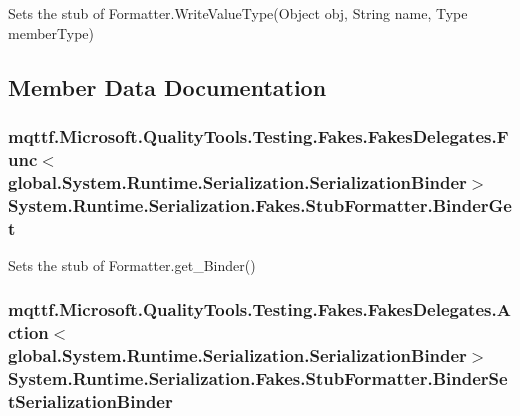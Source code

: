 Sets the stub of Formatter.\-Write\-Value\-Type(\-Object obj, String name, Type member\-Type)



\subsection{Member Data Documentation}
\hypertarget{class_system_1_1_runtime_1_1_serialization_1_1_fakes_1_1_stub_formatter_a60838b42520cedc66b3c598d78836bb0}{
\subsubsection[{Binder\-Get}]{\setlength{\rightskip}{0pt plus 5cm}mqttf.\-Microsoft.\-Quality\-Tools.\-Testing.\-Fakes.\-Fakes\-Delegates.\-Func$<$global.\-System.\-Runtime.\-Serialization.\-Serialization\-Binder$>$ System.\-Runtime.\-Serialization.\-Fakes.\-Stub\-Formatter.\-Binder\-Get}}\label{class_system_1_1_runtime_1_1_serialization_1_1_fakes_1_1_stub_formatter_a60838b42520cedc66b3c598d78836bb0}


Sets the stub of Formatter.\-get\-\_\-\-Binder()

\hypertarget{class_system_1_1_runtime_1_1_serialization_1_1_fakes_1_1_stub_formatter_ad51cfb2e350aa409e0e63860b41a99e4}{
\subsubsection[{Binder\-Set\-Serialization\-Binder}]{\setlength{\rightskip}{0pt plus 5cm}mqttf.\-Microsoft.\-Quality\-Tools.\-Testing.\-Fakes.\-Fakes\-Delegates.\-Action$<$global.\-System.\-Runtime.\-Serialization.\-Serialization\-Binder$>$ System.\-Runtime.\-Serialization.\-Fakes.\-Stub\-Formatter.\-Binder\-Set\-Serialization\-Binder}}\label{class_system_1_1_runtime_1_1_serialization_1_1_fakes_1_1_stub_formatter_ad51cfb2e350aa409e0e63860b41a99e4}



